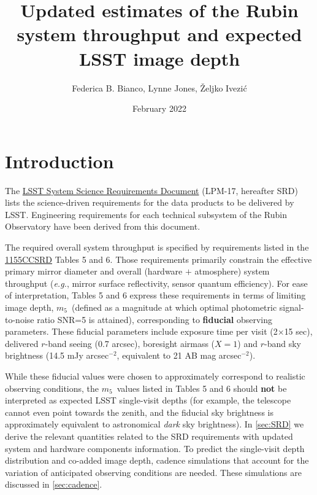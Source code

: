 \documentclass[PST,authoryear,toc]{lsstdoc}
\title{Updated estimates of the Rubin system throughput and expected LSST image depth}
\author{Federica B. Bianco, Lynne Jones, \v{Z}eljko Ivezi\'{c}}
\date{February 2022}
\date{\vcsDate}
\newcommand{\mf}{\ensuremath{m_5}}
\begin{document}
\maketitle


\section{Introduction}

The \href{https://docushare.lsst.org/docushare/dsweb/Get/LPM-17}{{LSST System Science Requirements Document}} (LPM-17, hereafter SRD) lists the science-driven requirements for the data products to be delivered by LSST. 
Engineering requirements for each technical subsystem of the Rubin Observatory have been derived from this document. 

The required overall system throughput is specified by requirements listed in the \href{https://docushare.lsst.org/docushare/dsweb/Get/LPM-17}{{1155CC}{SRD}} Tables 5 and 6. 
Those requirements primarily constrain the effective primary mirror diameter and overall (hardware $+$ atmosphere) 
system throughput ({\it e.g.}, mirror surface reflectivity, sensor quantum efficiency). For ease of interpretation, 
Tables 5 and 6 express these requirements in terms of limiting image depth, \mf\ (defined as a magnitude at which 
optimal photometric signal-to-noise ratio SNR=5 is attained), corresponding to {\bf fiducial} observing parameters. These fiducial parameters 
include exposure time per visit (2$\times$15 sec), delivered $r$-band seeing (0.7 arcsec), boresight airmass ($X=1$) and $r$-band sky brightness (14.5 mJy arcsec$^{-2}$, equivalent to 
21 AB mag arcsec$^{-2}$). 

While these fiducial values were chosen to approximately correspond to realistic observing conditions, the \mf\ values listed in Tables 5 and 6 should {\bf not} be interpreted as expected LSST single-visit depths (for example, 
the telescope cannot even point towards the zenith, and the fiducial sky brightness is approximately equivalent to 
astronomical {\it dark} sky brightness). In \autoref{sec:SRD} we derive the relevant quantities related to the SRD requirements with updated system and hardware components information. To predict the single-visit depth distribution and co-added image depth, 
cadence simulations that account for the variation of anticipated observing conditions are needed. These simulations are discussed 
in \autoref{sec:cadence}. 
\end{document}
